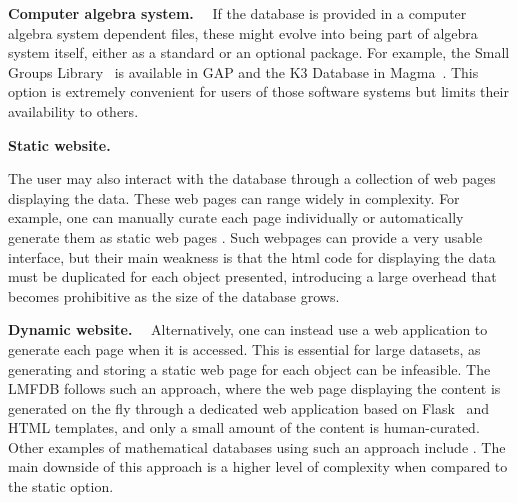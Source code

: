 \documentclass{amsart}
\newcommand{\subhead}[1]{\vspace{0.1in} \noindent \textbf{#1.}\ \ }
\begin{document}
\subhead{Computer algebra system}
    If the database is provided in a computer algebra system dependent files, these might evolve into being part of algebra system itself, either as a standard or an optional package.
    For example, the Small Groups Library~\cite{smallgroups} is available in GAP and the K3 Database in Magma~\cite{magmadb}.
    This option is extremely convenient for users of those software systems but limits their availability to others.

\subhead{Static website}

The user may also interact with the database through a collection of web pages displaying the data.
    These web pages can range widely in complexity.
    For example, one can manually curate each page individually \cites{cantorsattic, fanosearch} or automatically generate them as static web pages \cites{etc, graphclasses, SyzygyData, knotinfo, groupnames}.
    Such webpages can provide a very usable interface, but their main weakness is that the html code for displaying the data must be duplicated for each object presented, introducing a large overhead that becomes prohibitive as the size of the database grows.

\subhead{Dynamic website}
    Alternatively, one can instead use a web application to generate each page when it is accessed.
    This is essential for large datasets, as generating and storing a static web page for each object can be infeasible.
    The LMFDB follows such an approach, where the web page displaying the content is generated on the fly through a dedicated web application based on Flask~\cite{flask} and HTML templates, and only a small amount of the content is human-curated.
    Other examples of mathematical databases using such an approach include \cites{knotatlas, hog}.
    The main downside of this approach is a higher level of complexity when compared to the static option.
\end{document}
